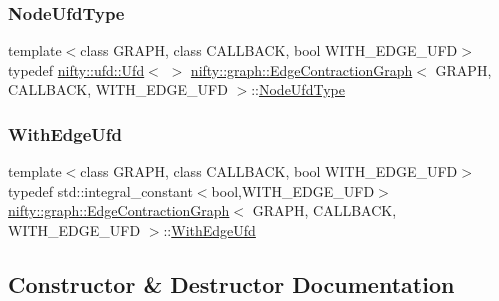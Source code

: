 \subsubsection{\texorpdfstring{Node\+Ufd\+Type}{NodeUfdType}}
{\footnotesize\ttfamily template$<$class G\+R\+A\+PH, class C\+A\+L\+L\+B\+A\+CK, bool W\+I\+T\+H\+\_\+\+E\+D\+G\+E\+\_\+\+U\+FD$>$ \\
typedef \hyperlink{classnifty_1_1ufd_1_1Ufd}{nifty\+::ufd\+::\+Ufd}$<$ $>$ \hyperlink{classnifty_1_1graph_1_1EdgeContractionGraph}{nifty\+::graph\+::\+Edge\+Contraction\+Graph}$<$ G\+R\+A\+PH, C\+A\+L\+L\+B\+A\+CK, W\+I\+T\+H\+\_\+\+E\+D\+G\+E\+\_\+\+U\+FD $>$\+::\hyperlink{classnifty_1_1graph_1_1EdgeContractionGraph_a7ff98238621f4b534e89b1880ee77239}{Node\+Ufd\+Type}}

\mbox{\label{classnifty_1_1graph_1_1EdgeContractionGraph_a9b33be5b2975fe298604326c10df1f93}} 
\subsubsection{\texorpdfstring{With\+Edge\+Ufd}{WithEdgeUfd}}
{\footnotesize\ttfamily template$<$class G\+R\+A\+PH, class C\+A\+L\+L\+B\+A\+CK, bool W\+I\+T\+H\+\_\+\+E\+D\+G\+E\+\_\+\+U\+FD$>$ \\
typedef std\+::integral\+\_\+constant$<$bool,W\+I\+T\+H\+\_\+\+E\+D\+G\+E\+\_\+\+U\+FD$>$ \hyperlink{classnifty_1_1graph_1_1EdgeContractionGraph}{nifty\+::graph\+::\+Edge\+Contraction\+Graph}$<$ G\+R\+A\+PH, C\+A\+L\+L\+B\+A\+CK, W\+I\+T\+H\+\_\+\+E\+D\+G\+E\+\_\+\+U\+FD $>$\+::\hyperlink{classnifty_1_1graph_1_1EdgeContractionGraph_a9b33be5b2975fe298604326c10df1f93}{With\+Edge\+Ufd}}



\subsection{Constructor \& Destructor Documentation}
\mbox{\label{classnifty_1_1graph_1_1EdgeContractionGraph_a4c8a53ef17ec713e184518364295bf01}} 
